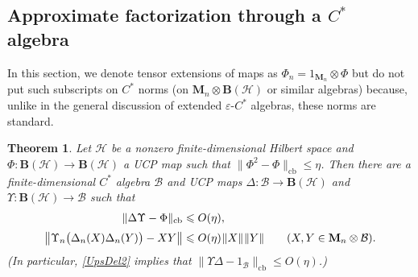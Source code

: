 \documentclass[12pt]{article}
\newcommand{\calB}{\mathcal{B}}
\newcommand{\calH}{\mathcal{H}}
\newcommand{\ts}{\mkern1mu}
\newcommand{\cb}{\mathrm{cb}}
\newcommand{\Bo}{\mathbf{B}}
\newcommand*{\Ma}[1]{\mathbf{M}_{#1}}
\newcommand{\eps}{\varepsilon}
\renewcommand{\le}{\leqslant}
\newtheorem{Theorem}{Theorem}[section]
\newtheorem[definition]{Definition}[Theorem]{Definition}
\newtheorem[remark]{Example}[Theorem]{Example}
\newtheorem[remark]{Remark}[Theorem]{Remark}
\newtheorem[remark]{Question}[Theorem]{Open question}
\newtheorem*[definition]{definition}{Definition}
\newtheorem*[remark]{example}{Example}
\newtheorem*[remark]{remark}{Remark}
\newtheorem*[remark]{question}{Open question}
\numberwithin{equation}{section}
\begin{document}
\subsection{Approximate factorization through a \texorpdfstring{$C^*$}{C*} algebra}\label{sec_approx_fact}

In this section, we denote tensor extensions of maps as $\Phi_n=1_{\Ma{n}}\otimes\Phi$ but do not put such subscripts on $C^*$ norms (on $\Ma{n}\otimes\Bo(\calH)$ or similar algebras) because, unlike in the general discussion of extended $\eps$-$C^*$ algebras, these norms are standard.

\begin{Theorem}\label{th_factorization}
Let $\calH$ be a nonzero finite-dimensional Hilbert space and $\Phi\colon\Bo(\calH)\to\Bo(\calH)$ a UCP map such that $\|\Phi^2-\Phi\|_\cb\le\eta$. Then there are a finite-dimensional $C^*$ algebra $\calB$ and UCP maps $\Delta\colon\calB\to\Bo(\calH)$ and $\Upsilon\colon\Bo(\calH)\to\calB$ such that
\begin{align}
\label{DelUps}
\|\Delta\Upsilon-\Phi\|_\cb&\le O(\eta),\\[2pt]
\label{UpsDel2}
\bigl\|\Upsilon_n\bigl(\Delta_n(X)\Delta_n(Y)\bigr)-XY\bigr\|
&\le O(\eta)\ts\|X\|\ts\|Y\|\qquad (X,Y\in\Ma{n}\otimes\calB).
\end{align}
(In particular, \eqref{UpsDel2} implies that $\|\Upsilon\Delta-1_\calB\|_\cb\le O(\eta)$.)
\end{Theorem}
\end{document}
